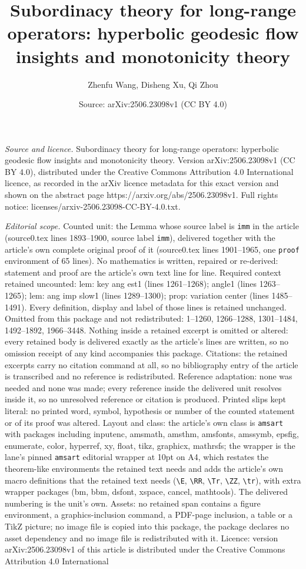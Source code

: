 \documentclass[10pt,a4paper]{amsart}
\title[Subordinacy theory for long-range operators: hyperbolic geod]{Subordinacy theory for long-range operators: hyperbolic geodesic flow insights and monotonicity theory}
\author{Zhenfu Wang, Disheng Xu, Qi Zhou}
\date{Source: arXiv:2506.23098v1 (CC BY 4.0)}
\begin{document}
\maketitle

\noindent\emph{Source and licence.} Subordinacy theory for long-range operators: hyperbolic geodesic flow insights and monotonicity theory. Version arXiv:2506.23098v1 (CC BY 4.0), distributed under the Creative Commons Attribution 4.0 International licence, as recorded in the arXiv licence metadata for this exact version and shown on the abstract page https://arxiv.org/abs/2506.23098v1. Full rights notice: licenses/arxiv-2506.23098-CC-BY-4.0.txt.\par\smallskip

\noindent\textit{Editorial scope.} Counted unit: the Lemma whose source label is \texttt{imm} in the article (source0.tex lines 1893--1900, source label \texttt{imm}), delivered together with the article's own complete original proof of it (source0.tex lines 1901--1965, one \texttt{proof} environment of 65 lines). No mathematics is written, repaired or re-derived: statement and proof are the article's own text line for line. Required context retained uncounted: lem: key ang est1 (lines 1261--1268); angle1 (lines 1263--1265); lem: ang imp slow1 (lines 1289--1300); prop: variation center (lines 1485--1491). Every definition, display and label of those lines is retained unchanged. Omitted from this package and not redistributed: 1--1260, 1266--1288, 1301--1484, 1492--1892, 1966--3448. Nothing inside a retained excerpt is omitted or altered: every retained body is delivered exactly as the article's lines are written, so no omission receipt of any kind accompanies this package. Citations: the retained excerpts carry no citation command at all, so no bibliography entry of the article is transcribed and no reference is redistributed. Reference adaptation: none was needed and none was made; every reference inside the delivered unit resolves inside it, so no unresolved reference or citation is produced. Printed slips kept literal: no printed word, symbol, hypothesis or number of the counted statement or of its proof was altered. Layout and class: the article's own class is \texttt{amsart} with packages including inputenc, amsmath, amsthm, amsfonts, amssymb, epsfig, enumerate, color, hyperref, xy, float, tikz, graphicx, mathrsfs; the wrapper is the lane's pinned \texttt{amsart} editorial wrapper at 10pt on A4, which restates the theorem-like environments the retained text needs and adds the article's own macro definitions that the retained text needs (\texttt{\textbackslash E}, \texttt{\textbackslash RR}, \texttt{\textbackslash Tr}, \texttt{\textbackslash ZZ}, \texttt{\textbackslash tr}), with extra wrapper packages (bm, bbm, dsfont, xspace, cancel, mathtools). The delivered numbering is the unit's own. Assets: no retained span contains a figure environment, a graphics-inclusion command, a PDF-page inclusion, a table or a TikZ picture; no image file is copied into this package, the package declares no asset dependency and no image file is redistributed with it. Licence: version arXiv:2506.23098v1 of this article is distributed under the Creative Commons Attribution 4.0 International 
\end{document}
